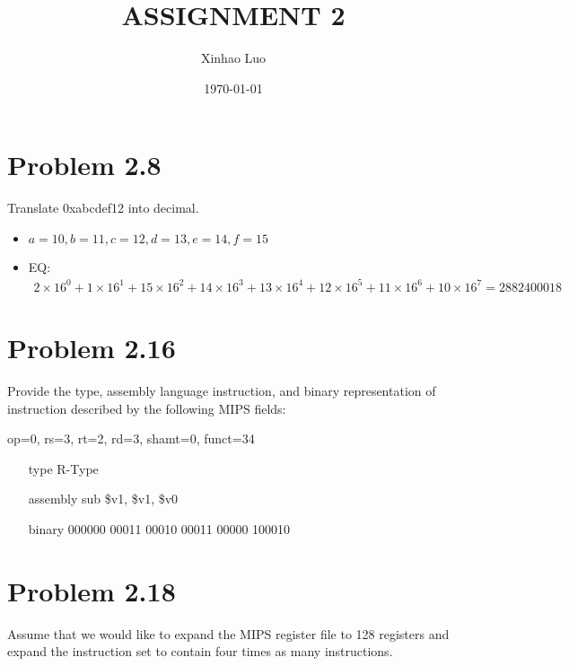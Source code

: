 \documentclass{article}
\title{\bf \Large ASSIGNMENT 2}
\author{Xinhao Luo}
\date{\today}
\def\math#1{$#1$}
\begin{document}
\maketitle
\medskip

\section{Problem 2.8}

Translate 0xabcdef12 into decimal.

\begin{itemize}
    \item \math{a = 10, b = 11, c = 12, d = 13, e = 14, f = 15}
    \item EQ: \begin{equation}
            \begin{split}
                2 \times 16^0 + 1 \times 16^1 + 15 \times 16^2 + 14 \times 16^3 + 13 \times 16^4 + 12 \times 16^5 + 11 \times 16^6 + 10 \times 16^7 = 2882400018
            \end{split}
        \end{equation}
\end{itemize}

\section{Problem 2.16}
Provide the type, assembly language instruction, and binary representation of instruction described by the following MIPS fields:

op=0, rs=3, rt=2, rd=3, shamt=0, funct=34

\begin{itemize}
    \item [type] R-Type
    \item [assembly] sub \$v1, \$v1, \$v0
    \item [binary] 000000 00011 00010 00011 00000 100010
\end{itemize}

\section{Problem 2.18}
Assume that we would like to expand the MIPS register file to 128 registers and expand the instruction set to contain four times as many instructions.
\end{document}
